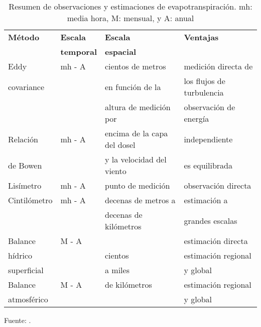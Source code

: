 \begin{table}[ht]
\caption{Resumen de observaciones y estimaciones de evapotranspiración. mh: media hora, M: mensual, y A: anual}
\vspace{.2cm}
\label{tab:TableZhang01}
\centering
\begin{tabular}{l|l|l|l}
\hline
\textbf{Método} & \textbf{Escala}   & \textbf{Escala}             & \textbf{Ventajas}         \\
                & \textbf{temporal} & \textbf{espacial}           &                           \\ \hline
Eddy            & mh - A            & cientos de metros           & medición directa de       \\
covariance      &                   & en función de la            & los flujos de turbulencia \\
                &                   & altura de medición por      & observación de energía    \\ \cline{1-2}
Relación           & mh - A            & encima de la capa del dosel & independiente             \\
de Bowen        &                   & y la velocidad del viento   & es equilibrada            \\ \hline
Lisímetro       & mh - A            & punto de medición           & observación directa       \\ \cline{1-3}
Cintilómetro    & mh - A            & decenas de metros a         & estimación a              \\
                &                   & decenas de kilómetros       & grandes escalas           \\ \hline
Balance         & M - A             &                             & estimación directa        \\
hídrico         &                   & cientos                     & estimación regional       \\
superficial    &                   & a miles                     & y global                  \\ \cline{1-2} \cline{4-4} 
Balance         & M - A             & de kilómetros               & estimación regional       \\
atmosférico     &                   &                             & y global                  \\ \hline
\end{tabular}
\end{table}
\vspace*{-.5cm}
Fuente: \citet{wang2012review}.

